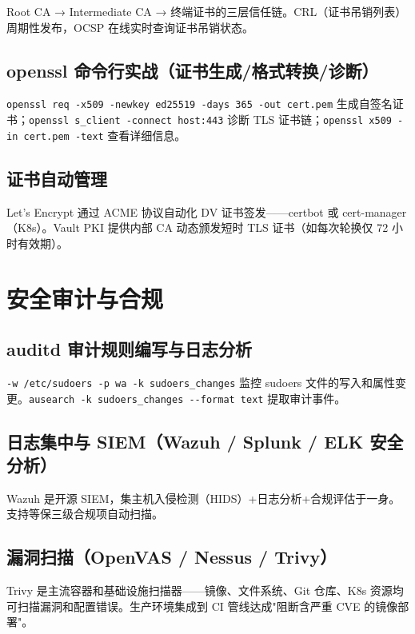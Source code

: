 \documentclass[12pt,UTF8]{ctexbook}
\begin{document}
Root CA → Intermediate CA → 终端证书的三层信任链。CRL（证书吊销列表）周期性发布，OCSP 在线实时查询证书吊销状态。

  \section{openssl 命令行实战（证书生成/格式转换/诊断）}

\verb|openssl req -x509 -newkey ed25519 -days 365 -out cert.pem| 生成自签名证书；\verb|openssl s_client -connect host:443| 诊断 TLS 证书链；\verb|openssl x509 -in cert.pem -text| 查看详细信息。

  \section{证书自动管理}

Let's Encrypt 通过 ACME 协议自动化 DV 证书签发——certbot 或 cert-manager（K8s）。Vault PKI 提供内部 CA 动态颁发短时 TLS 证书（如每次轮换仅 72 小时有效期）。


\chapter{安全审计与合规}
\label{chap:security-audit}

  \section{auditd 审计规则编写与日志分析}

\verb|-w /etc/sudoers -p wa -k sudoers_changes| 监控 sudoers 文件的写入和属性变更。\verb|ausearch -k sudoers_changes --format text| 提取审计事件。

  \section{日志集中与 SIEM（Wazuh / Splunk / ELK 安全分析）}

Wazuh 是开源 SIEM，集主机入侵检测（HIDS）+日志分析+合规评估于一身。支持等保三级合规项自动扫描。

  \section{漏洞扫描（OpenVAS / Nessus / Trivy）}

Trivy 是主流容器和基础设施扫描器——镜像、文件系统、Git 仓库、K8s 资源均可扫描漏洞和配置错误。生产环境集成到 CI 管线达成"阻断含严重 CVE 的镜像部署"。
\end{document}

